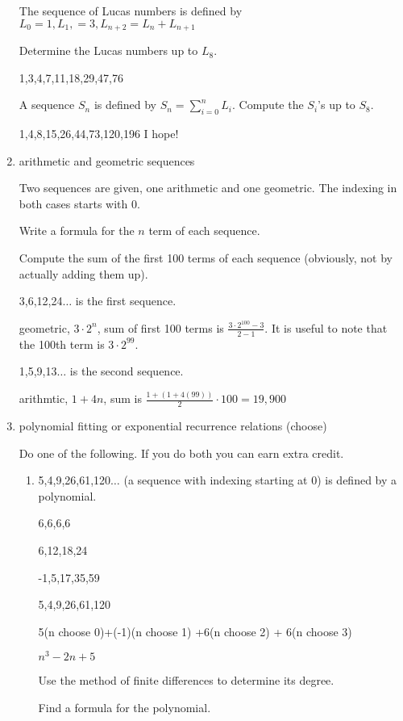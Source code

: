 \documentclass[12pt]{article}
\begin{document}
\begin{enumerate}
The sequence of Lucas numbers is defined by $L_0 = 1, L_1, = 3, L_{n+2} = L_n + L_{n+1}$

Determine the Lucas numbers up to $L_8$.

1,3,4,7,11,18,29,47,76

A sequence $S_n$ is defined by $S_n = \sum_{i=0}^n L_i$.  Compute the $S_i$'s up to $S_8$.

1,4,8,15,26,44,73,120,196  I hope!

\newpage

\item  arithmetic and geometric sequences

Two sequences are given, one arithmetic and one geometric.  The indexing in both cases starts with 0.

Write a formula for the $n$ term of each sequence.

Compute the sum of the first 100 terms of each sequence (obviously, not by actually adding them up).

3,6,12,24$\ldots$ is the first sequence.

geometric, $3 \cdot 2^n$, sum of first 100 terms is $\frac{3\cdot 2^{100}-3}{2-1}$.  It is useful to note
that the 100th term is $3 \cdot 2^{99}$.

1,5,9,13$\ldots$ is the second sequence.

arithmtic, $1+4n$, sum is $\frac{1+(1+4(99))}2 \cdot 100=19,900$

\newpage

\item  polynomial fitting or exponential recurrence relations (choose)

Do one of the following.  If you do both you can earn extra credit.

\begin{enumerate}

\item 5,4,9,26,61,120$\ldots$ (a sequence with indexing starting at 0) is defined by a polynomial.  

6,6,6,6

6,12,18,24

-1,5,17,35,59

5,4,9,26,61,120

5(n choose 0)+(-1)(n choose 1) +6(n choose 2) + 6(n choose 3)

$n^3-2n+5$



Use the method of finite differences to determine its degree.

Find a formula for the polynomial.


\end{enumerate}
\end{enumerate}
\end{document}
